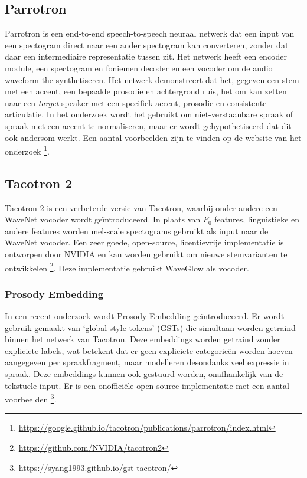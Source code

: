 \subsection{Parrotron}
Parrotron is een end-to-end speech-to-speech neuraal netwerk dat een input van een spectogram direct naar een ander spectogram kan converteren, zonder dat daar een intermediaire representatie tussen zit\cite{biadsy2019parrotron}. Het netwerk heeft een encoder module, een spectogram en foniemen decoder en een vocoder om de audio waveform the synthetiseren. Het netwerk demonstreert dat het, gegeven een stem met een accent, een bepaalde prosodie en achtergrond ruis, het om kan zetten naar een \textit{target} speaker met een specifiek accent, prosodie en consistente articulatie. In het onderzoek wordt het gebruikt om niet-verstaanbare spraak of spraak met een accent te normaliseren, maar er wordt gehypothetiseerd dat dit ook andersom werkt. Een aantal voorbeelden zijn te vinden op de website van het onderzoek \footnote{\url{https://google.github.io/tacotron/publications/parrotron/index.html}}.






\subsection{Tacotron 2}
Tacotron 2 is een verbeterde versie van Tacotron, waarbij onder andere een WaveNet vocoder wordt geïntroduceerd\cite{Shen2018NaturalTS}. In plaats van $F_0$ features, linguistieke en andere features worden mel-scale spectograms gebruikt als input naar de WaveNet vocoder. Een zeer goede, open-source, licentievrije implementatie is ontworpen door NVIDIA en kan worden gebruikt om nieuwe stemvarianten te ontwikkelen \footnote{\url{https://github.com/NVIDIA/tacotron2}}. Deze implementatie gebruikt WaveGlow als vocoder.




\subsubsection{Prosody Embedding}
In een recent onderzoek wordt Prosody Embedding geïntroduceerd\cite{skerry2018towards}. Er wordt gebruik gemaakt van `global style tokens' (GSTs) die simultaan worden getraind binnen het netwerk van Tacotron. Deze embeddings worden getraind zonder expliciete labels, wat betekent dat er geen expliciete categorieën worden hoeven aangegeven per spraakfragment, maar modelleren desondanks veel expressie in spraak. Deze embeddings kunnen ook gestuurd worden, onafhankelijk van de tekstuele input. Er is een onofficiële open-source implementatie met een aantal voorbeelden \footnote{\url{https://syang1993.github.io/gst-tacotron/}}.

